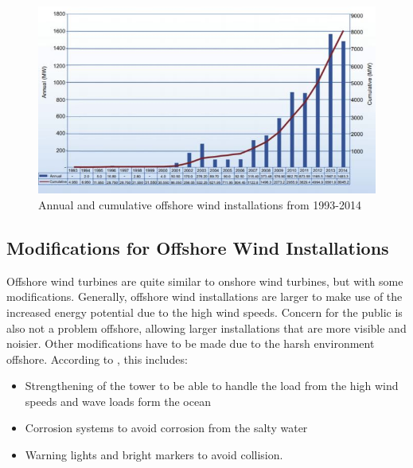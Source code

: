 \begin{figure}[H]
\centering
\includegraphics[scale=1.1]{figures/development}
\caption[$\; \:$Annual and cumulative offshore wind installations from 1993-2014]{Annual and cumulative offshore wind installations from 1993-2014 \cite{NG2016}}
 \label{fig:development}
\end{figure}


\subsection{Modifications for Offshore Wind Installations}
Offshore wind turbines are quite similar to onshore wind turbines, but with some modifications. Generally, offshore wind installations are larger to make use of the increased energy potential due to the high wind speeds. Concern for the public is also not a problem offshore, allowing larger installations that are more visible and noisier. Other modifications have to be made due to the harsh environment offshore. According to \cite{Kapsali2012}, this includes:
\begin{itemize}
    \item Strengthening of the tower to be able to handle the load from the high wind speeds and wave loads form the ocean
    \item Corrosion systems to avoid corrosion from the salty water
    \item Warning lights and bright markers to avoid collision. 
\end{itemize}

